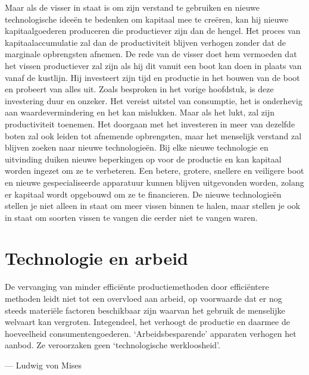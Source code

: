 Maar als de visser in staat is om zijn verstand te gebruiken en nieuwe technologische ideeën te bedenken om kapitaal mee te creëren, kan hij nieuwe kapitaalgoederen produceren die productiever zijn dan de hengel. Het proces van kapitaalaccumulatie zal dan de productiviteit blijven verhogen zonder dat de marginale opbrengsten afnemen. De rede van de visser doet hem vermoeden dat het vissen productiever zal zijn als hij dit vanuit een boot kan doen in plaats van vanaf de kustlijn. Hij investeert zijn tijd en productie in het bouwen van de boot en probeert van alles uit. Zoals besproken in het vorige hoofdstuk, is deze investering duur en onzeker. Het vereist uitstel van consumptie, het is onderhevig aan waardevermindering en het kan mislukken. Maar als het lukt, zal zijn productiviteit toenemen. Het doorgaan met het investeren in meer van dezelfde boten zal ook leiden tot afnemende opbrengsten, maar het menselijk verstand zal blijven zoeken naar nieuwe technologieën. Bij elke nieuwe technologie en uitvinding duiken nieuwe beperkingen op voor de productie en kan kapitaal worden ingezet om ze te verbeteren. Een betere, grotere, snellere en veiligere boot en nieuwe gespecialiseerde apparatuur kunnen blijven uitgevonden worden, zolang er kapitaal wordt opgebouwd om ze te financieren. De nieuwe technologieën stellen je niet alleen in staat om meer vissen binnen te halen, maar stellen je ook in staat om soorten vissen te vangen die eerder niet te vangen waren.


\hypertarget{technologie-en-arbeid}{%
\section{Technologie en arbeid}\label{technologie-en-arbeid}}

\begin{blockquotebox}
    De vervanging van minder efficiënte productiemethoden door efficiëntere methoden leidt niet tot een overvloed aan arbeid, op voorwaarde dat er nog steeds materiële factoren beschikbaar zijn waarvan het gebruik de menselijke welvaart kan vergroten. Integendeel, het verhoogt de productie en daarmee de hoeveelheid consumentengoederen. `Arbeidsbesparende' apparaten verhogen het aanbod. Ze veroorzaken geen `technologische werkloosheid'.\footnotemark
    \par\raggedleft--- Ludwig von Mises
\end{blockquotebox} 

